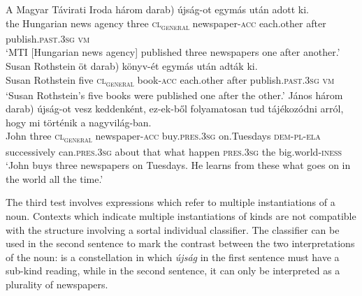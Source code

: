 \documentclass[output=paper]{langscibook}
\begin{document}
\ea \label{schv-nem:ex:13}
\gll  A Magyar Távirati Iroda három \minsp{(*} darab) újság-ot egymás után adott ki. \\
the Hungarian news agency three {} \textsc{cl\textsubscript{general}} newspaper-\textsc{acc} each.other after publish.\textsc{past}.\textsc{3sg} \textsc{vm}\\
\glt `MTI [Hungarian news agency] %
published three newspapers one after another.'
\ex \label{schv-nem:ex:14}
\gll  Susan Rothstein öt \minsp{(*} darab) könyv-ét egymás után adták ki. \\
 Susan Rothstein five {} \textsc{cl\textsubscript{general}} book-\textsc{acc} each.other after publish.\textsc{past}.\textsc{3sg} \textsc{vm} \\
\glt `Susan Rothstein’s five books were published one after the other.'
\ex \label{schv-nem:ex:15}
\gll János három \minsp{(*} darab) újság-ot vesz keddenként, ez-ek-ből folyamatosan tud tájékozódni arról, hogy mi történik a nagyvilág-ban. \\
John three {} \textsc{cl\textsubscript{general}} newspaper-\textsc{acc} buy.\textsc{pres}.\textsc{3sg} on.Tuesdays   \textsc{dem}-\textsc{pl}-\textsc{ela} successively can.\textsc{pres}.\textsc{3sg} about that what happen \textsc{pres}.\textsc{3sg} the big.world-\textsc{iness}\\
\glt `John buys three newspapers on Tuesdays. He learns from these what goes on in the world all the time.'
\z

\noindent The third test involves expressions which refer to multiple instantiations of a noun. Contexts which indicate multiple instantiations of kinds are not compatible with the structure involving a sortal individual classifier. The classifier can be used in the second sentence to mark the contrast between the two interpretations of the noun:  is a constellation in which \textit{újság} in the first sentence must have a sub-kind reading, while in the second sentence, it can only be interpreted as a plurality of newspapers.\largerpage
\end{document}

